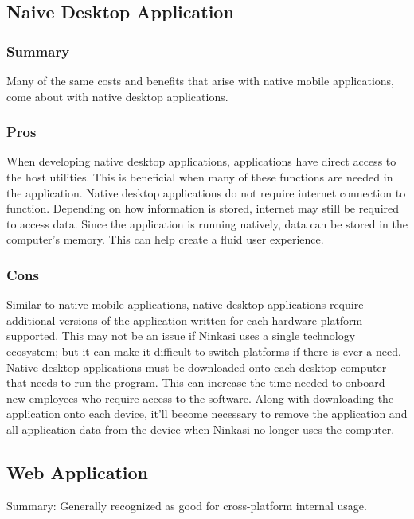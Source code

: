 \documentclass[draftclsnofoot,onecolumn,letterpaper,10pt,compsoc]{IEEEtran}
\begin{document}
    
	\subsection{Naive Desktop Application}
        \subsubsection{Summary}
            Many of the same costs and benefits that arise with native mobile applications, come about with native desktop applications.
        
        \subsubsection{Pros}
            When developing native desktop applications, applications have direct access to the host utilities. 
            This is beneficial when many of these functions are needed in the application.
            Native desktop applications do not require internet connection to function.
            Depending on how information is stored, internet may still be required to access data.
            Since the application is running natively, data can be stored in the computer's memory.
            This can help create a fluid user experience.
    
        \subsubsection{Cons}
            Similar to native mobile applications, native desktop applications require additional versions of the application written for each hardware platform supported.
            This may not be an issue if Ninkasi uses a single technology ecosystem; but it can make it difficult to switch platforms if there is ever a need.
            Native desktop applications must be downloaded onto each desktop computer that needs to run the program.
            This can increase the time needed to onboard new employees who require access to the software.
            Along with downloading the application onto each device, it'll become necessary to remove the application and all application data from the device when Ninkasi no longer uses the computer.
    
    
	\subsection{Web Application}
    Summary:
        Generally recognized as good for cross-platform internal usage.
    
\end{document}
